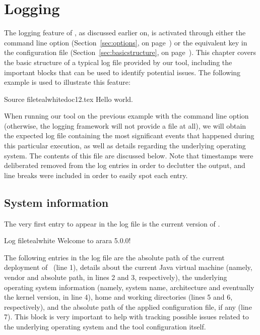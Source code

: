 \chapter{Logging}
\label{chap:logging}

The logging feature of \arara, as discussed earlier on, is activated through either the  command line option (Section~\ref{sec:options}, on page~\pageref{sec:options}) or the equivalent key in the configuration file (Section~\ref{sec:basicstructure}, on page~\pageref{sec:basicstructure}). This chapter covers the basic structure of a typical log file provided by our tool, including the important blocks that can be used to identify potential issues. The following example is used to illustrate this feature:

\begin{ncodebox}{Source file}{teal}{\icnote}{white}{doc12.tex}
Hello world.
\bye
\end{ncodebox}

When running our tool on the previous example with the  command line option (otherwise, the logging framework will not provide a file at all), we will obtain the expected  log file containing the most significant events that happened during this particular execution, as well as details regarding the underlying operating system. The contents of this file are discussed below. Note that timestamps were deliberated removed from the log entries in order to declutter the output, and line breaks were included in order to easily spot each entry.

\section{System information}
\label{sec:systeminformation}

The very first entry to appear in the log file is the current version of \arara. 

\begin{codebox}{Log file}{teal}{\icnote}{white}
Welcome to arara 5.0.0!
\end{codebox}


The following entries in the log file are the absolute path of the current deployment of \arara\ (line 1), details about the current Java virtual machine (namely, vendor and absolute path, in lines 2 and 3, respectively), the underlying operating system information (namely, system name, architecture and eventually the kernel version, in line 4), home and working directories (lines 5 and 6, respectively), and the absolute path of the applied configuration file, if any (line 7). This block is very important to help with tracking possible issues related to the underlying operating system and the tool configuration itself.

